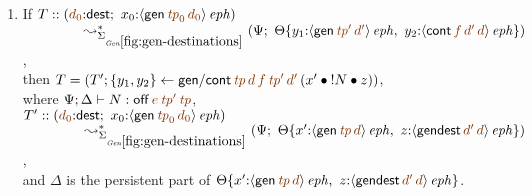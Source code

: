 \begin{lemma}
\begin{enumerate}
\medskip
\item If 
   $T :: (\lf{d_0}{:}{\sf dest}; ~
            x_0{:}\iseph{\susp{{\sf gen}\,\lf{{\it tp}_0}\,\lf{d_0}}})$
\\
   $~\qquad \qquad \leadsto^*_{\siggendests}
         (\Psi; ~
          \tackon{\Theta}
           {y_1{:}\iseph{\susp{{\sf gen}\,\lf{{\it tp}'}\,\lf{d'}}}, ~
            y_2{:}\iseph{\susp{{\sf cont}\,\lf{f}\,\lf{d'}\,\lf{d}}}})$,
\smallskip
\\ then 
   $T = \left(T';
       \trstep{y_1, y_2}{{\sf gen/cont}
       \,\lf{{\it tp}}\,\lf{d}\,\lf{f}\,\lf{{\it tp}'}\,\lf{d'}
       \,(\tfuser{x'}{\tfuser{\tbangr{N}}{z}})}\right)$,
\\ where
   $\Psi; \Delta \vdash N : {\sf off}\,\lf{e}\,\lf{{\it tp}'}\,\lf{{\it tp}}$,
\\ $T' :: (\lf{d_0}{:}{\sf dest}; ~
            x_0{:}\iseph{\susp{{\sf gen}\,\lf{{\it tp}_0}\,\lf{d_0}}})$
\\ $~\qquad\qquad        \leadsto^*_{\siggendests}
         (\Psi; ~
          \tackon{\Theta}
           {x'{:}\iseph{\susp{{\sf gen}\,\lf{{\it tp}}\,\lf{d}}}, ~
            z{:}\iseph{\susp{{\sf gendest}\,\lf{d'}\,\lf{d}}}})$,
\smallskip
\\ and $\Delta$ is the persistent part of 
   $\tackon{\Theta}
           {x'{:}\iseph{\susp{{\sf gen}\,\lf{{\it tp}}\,\lf{d}}}, ~
            z{:}\iseph{\susp{{\sf gendest}\,\lf{d'}\,\lf{d}}}}$.





\medskip
\end{enumerate}
\end{lemma}

